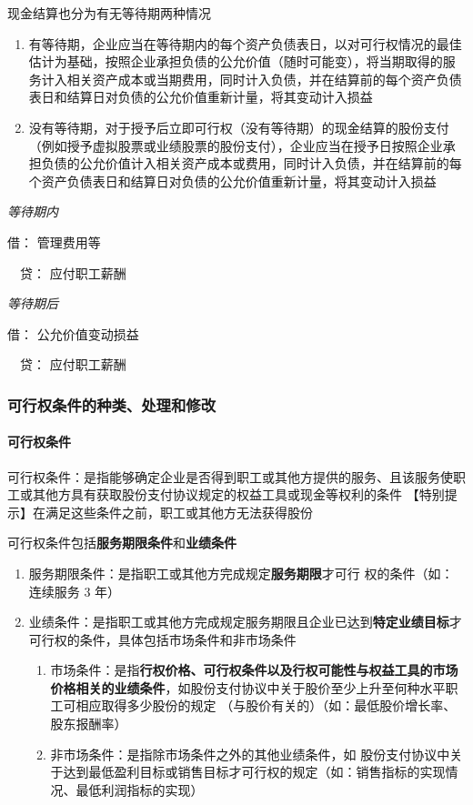 \documentclass[UTF8,12pt]{ctexart}
\newenvironment{Dr}{\noindent 借：}{\par}
\newenvironment{Cr}{\noindent \ \ 贷：}{\par}
\numberwithin{equation}{section} %
\numberwithin{figure}{section}
\numberwithin{table}{section}
\begin{document}
	现金结算也分为有无等待期两种情况
	
	\begin{enumerate}
		\item 有等待期，企业应当在等待期内的每个资产负债表日，以对可行权情况的最佳估计为基础，按照企业承担负债的公允价值（随时可能变），将当期取得的服务计入相关资产成本或当期费用，同时计入负债，并在结算前的每个资产负债表日和结算日对负债的公允价值重新计量，将其变动计入损益
		
		\item 没有等待期，对于授予后立即可行权（没有等待期）的现金结算的股份支付（例如授予虚拟股票或业绩股票的股份支付），企业应当在授予日按照企业承担负债的公允价值计入相关资产成本或费用，同时计入负债，并在结算前的每个资产负债表日和结算日对负债的公允价值重新计量，将其变动计入损益
	\end{enumerate}
	
	\textit{等待期内}
	
	\begin{Dr}
		管理费用等
	\end{Dr}
	\begin{Cr}
		应付职工薪酬
	\end{Cr}
	
	\textit{等待期后}
	
	\begin{Dr}
		公允价值变动损益
	\end{Dr}
	\begin{Cr}
		应付职工薪酬
	\end{Cr}
	
	
	\subsubsection{可行权条件的种类、处理和修改}
	\paragraph{可行权条件}可行权条件：是指能够确定企业是否得到职工或其他方提供的服务、且该服务使职工或其他方具有获取股份支付协议规定的权益工具或现金等权利的条件
	【特别提示】在满足这些条件之前，职工或其他方无法获得股份
	
	可行权条件包括\textbf{服务期限条件}和\textbf{业绩条件}
	\begin{enumerate}
		\item 服务期限条件：是指职工或其他方完成规定\textbf{服务期限}才可行 权的条件（如：连续服务 3 年）
		
		\item 业绩条件：是指职工或其他方完成规定服务期限且企业已达到\textbf{特定业绩目标}才可行权的条件，具体包括市场条件和非市场条件
		\begin{enumerate}
			\item 市场条件：是指\textbf{行权价格、可行权条件以及行权可能性与权益工具的市场价格相关的业绩条件}，如股份支付协议中关于股价至少上升至何种水平职工可相应取得多少股份的规定
			（与股价有关的）（如：最低股价增长率、股东报酬率）
			
			\item 非市场条件：是指除市场条件之外的其他业绩条件，如 股份支付协议中关于达到最低盈利目标或销售目标才可行权的规定（如：销售指标的实现情况、最低利润指标的实现）
		\end{enumerate}
	\end{enumerate}
	
\end{document}
